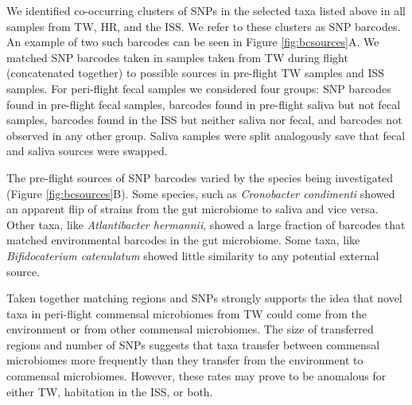 We identified co-occurring clusters of SNPs in the selected taxa listed above in all samples from TW, HR, and the ISS. We refer to these clusters as SNP barcodes. An example of two such barcodes can be seen in Figure \ref{fig:bcsources}A. We matched SNP barcodes taken in samples taken from TW during flight (concatenated together) to possible sources in pre-flight TW samples and ISS samples. For peri-flight fecal samples we considered four groups: SNP barcodes found in pre-flight fecal samples, barcodes found in pre-flight saliva but not fecal samples, barcodes found in the ISS but neither saliva nor fecal, and barcodes not observed in any other group. Saliva samples were split analogously save that fecal and saliva sources were swapped.

The pre-flight sources of SNP barcodes varied by the species being investigated (Figure \ref{fig:bcsources}B). Some species, such as \textit{Cronobacter condimenti} showed an apparent flip of strains from the gut microbiome to saliva and vice versa. Other taxa, like \textit{Atlantibacter hermannii}, showed a large fraction of barcodes that matched environmental barcodes in the gut microbiome. Some taxa, like \textit{Bifidocaterium catenulatum} showed little similarity to any potential external source.

Taken together matching regions and SNPs strongly supports the idea that novel taxa in peri-flight commensal microbiomes from TW could come from the environment or from other commensal microbiomes. The size of transferred regions and number of SNPs suggests that taxa transfer between commensal microbiomes more frequently than they transfer from the environment to commensal microbiomes. However, these rates may prove to be anomalous for either TW, habitation in the ISS, or both.

